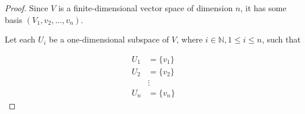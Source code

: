 \documentclass[12pt,letterpaper]{article}
\begin{document}
\begin{enumerate}
      \begin{proof}
        Since $V$ is a finite-dimensional vector space of dimension $n$,
        it has some basis $(V_1, v_2, ..., v_n)$.
        
        Let each $U_i$ be a one-dimensional subspace of $V$, where $i \in \mathbb{N}, 1 \le i \le n$, such that

        \begin{align*}
          U_1 &= \{v_1\} \\
          U_2 &= \{v_2\} \\
          &\vdots \\
          U_n &= \{v_n\}
        \end{align*}
      \end{proof}

  \end{enumerate}
\end{document}
